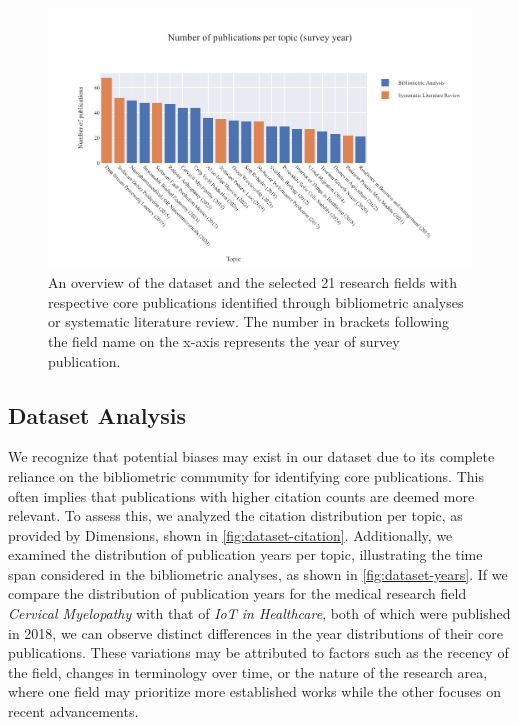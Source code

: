 \begin{figure}
	\centering	
	\includegraphics[scale=0.75]{pics/dataset-overview.pdf}
	\caption[Dataset Overview of the Research Topics]{An overview of the dataset and the selected 21 research fields with respective core publications identified through bibliometric analyses or systematic literature review. The number in brackets following the field name on the x-axis represents the year of survey publication.}
	\label{fig:dataset-overview}
\end{figure}


\subsection{Dataset Analysis}

We recognize that potential biases may exist in our dataset due to its complete reliance on the bibliometric community for identifying core publications. This often implies that publications with higher citation counts are deemed more relevant. To assess this, we analyzed the citation distribution per topic, as provided by Dimensions, shown in \autoref{fig:dataset-citation}. Additionally, we examined the distribution of publication years per topic, illustrating the time span considered in the bibliometric analyses, as shown in \autoref{fig:dataset-years}.  If we compare the distribution of publication years for the medical research field \textit{Cervical Myelopathy} with that of \textit{IoT in Healthcare}, both of which were published in 2018, we can observe distinct differences in the year distributions of their core publications. These variations may be attributed to factors such as the recency of the field, changes in terminology over time, or the nature of the research area, where one field may prioritize more established works while the other focuses on recent advancements.


